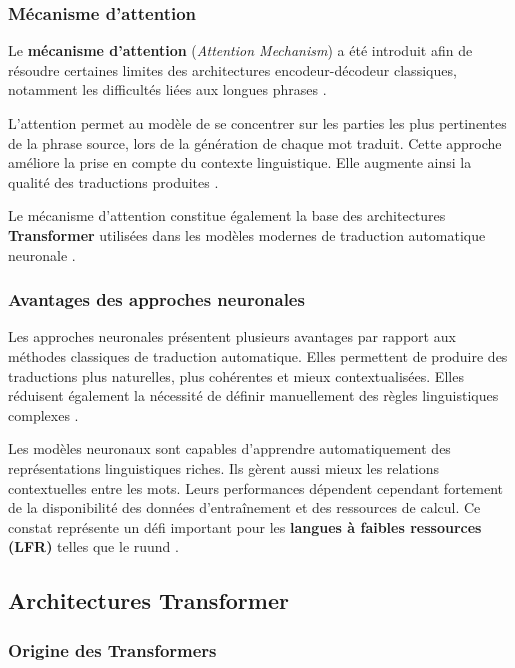 \subsubsection{Mécanisme d'attention}

Le \textbf{mécanisme d'attention} (\textit{Attention Mechanism}) a été introduit afin de résoudre certaines limites des architectures encodeur-décodeur classiques, notamment les difficultés liées aux longues phrases \cite{vaswani2017attention}.

L'attention permet au modèle de se concentrer sur les parties les plus pertinentes de la phrase source, lors de la génération de chaque mot traduit. Cette approche améliore la prise en compte du contexte linguistique. Elle augmente ainsi la qualité des traductions produites \cite{gangar2021hindi}.

Le mécanisme d'attention constitue également la base des architectures \textbf{Transformer} utilisées dans les modèles modernes de traduction automatique neuronale \cite{vaswani2017attention}.

\subsubsection{Avantages des approches neuronales}

Les approches neuronales présentent plusieurs avantages par rapport aux méthodes classiques de traduction automatique. Elles permettent de produire des traductions plus naturelles, plus cohérentes et mieux contextualisées. Elles réduisent également la nécessité de définir manuellement des règles linguistiques complexes \cite{ranathunga2023neural}.

Les modèles neuronaux sont capables d'apprendre automatiquement des représentations linguistiques riches. Ils gèrent aussi mieux les relations contextuelles entre les mots. Leurs performances dépendent cependant fortement de la disponibilité des données d'entraînement et des ressources de calcul. Ce constat représente un défi important pour les \textbf{langues à faibles ressources (\ac{LFR})} telles que le ruund \cite{haulai2023construction}.

\subsection{Architectures Transformer}

\subsubsection{Origine des Transformers}

